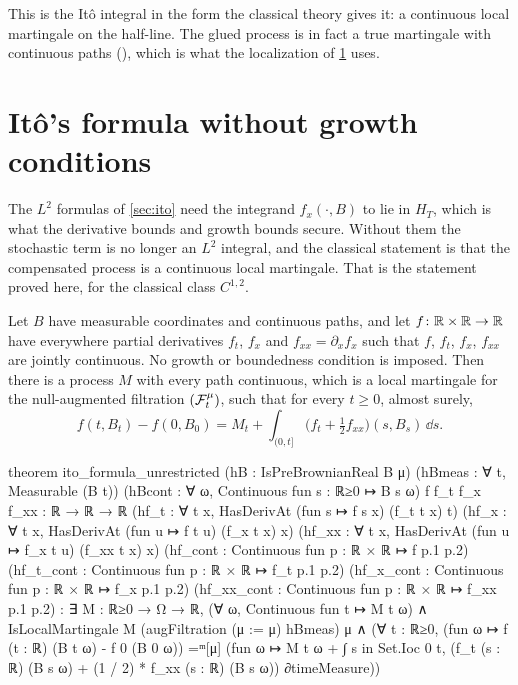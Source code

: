 \documentclass[11pt]{article}
\newcommand{\HT}{H_T}
\begin{document}
This is the It\^o integral in the form the classical theory gives it: a continuous local martingale on the
half-line. The glued process is in fact a true martingale with continuous paths
(), which is what the localization of
\cref{sec:unrestricted} uses.

\section{It\^o's formula without growth conditions}\label{sec:unrestricted}

The $L^2$ formulas of \cref{sec:ito} need the integrand $f_x(\cdot,B)$ to lie in $\HT$, which is what the
derivative bounds and growth bounds secure. Without them the stochastic term is no longer an $L^2$ integral,
and the classical statement is that the compensated process is a continuous local martingale. That is the
statement proved here, for the classical class $C^{1,2}$.

\begin{theorem}\label{thm:unrestricted}
Let $B$ have measurable coordinates and continuous paths, and let $f\colon\mathbb{R}\times\mathbb{R}\to\mathbb{R}$ have everywhere
partial derivatives $f_t$, $f_x$ and $f_{xx}=\partial_xf_x$ such that $f$, $f_t$, $f_x$, $f_{xx}$ are jointly
continuous. No growth or boundedness condition is imposed. Then there is a process $M$ with every path continuous,
which is a local martingale for the null-augmented filtration $(\mathcal{F}^\mu_t)$, such that for every $t\ge0$, almost
surely,
\[
  f(t,B_t)-f(0,B_0)=M_t+\int_{(0,t]}\bigl(f_t+\tfrac12f_{xx}\bigr)(s,B_s)\,\dd s .
\]
\end{theorem}

\begin{leancode}[caption={It\^o's formula without growth conditions (\texttt{Foundations/ItoFormulaUnrestrictedLocMart}).},label=lst:unrestricted]
theorem ito_formula_unrestricted (hB : IsPreBrownianReal B μ)
    (hBmeas : ∀ t, Measurable (B t)) (hBcont : ∀ ω, Continuous fun s : ℝ≥0 ↦ B s ω)
    {f f_t f_x f_xx : ℝ → ℝ → ℝ}
    (hf_t : ∀ t x, HasDerivAt (fun s ↦ f s x) (f_t t x) t)
    (hf_x : ∀ t x, HasDerivAt (fun u ↦ f t u) (f_x t x) x)
    (hf_xx : ∀ t x, HasDerivAt (fun u ↦ f_x t u) (f_xx t x) x)
    (hf_cont : Continuous fun p : ℝ × ℝ ↦ f p.1 p.2)
    (hf_t_cont : Continuous fun p : ℝ × ℝ ↦ f_t p.1 p.2)
    (hf_x_cont : Continuous fun p : ℝ × ℝ ↦ f_x p.1 p.2)
    (hf_xx_cont : Continuous fun p : ℝ × ℝ ↦ f_xx p.1 p.2) :
    ∃ M : ℝ≥0 → Ω → ℝ,
      (∀ ω, Continuous fun t ↦ M t ω) ∧
      IsLocalMartingale M (augFiltration (μ := μ) hBmeas) μ ∧
      (∀ t : ℝ≥0, (fun ω ↦ f (t : ℝ) (B t ω) - f 0 (B 0 ω)) =ᵐ[μ]
        (fun ω ↦ M t ω + ∫ s in Set.Ioc 0 t,
          (f_t (s : ℝ) (B s ω) + (1 / 2) * f_xx (s : ℝ) (B s ω)) ∂timeMeasure))
\end{leancode}
\end{document}
